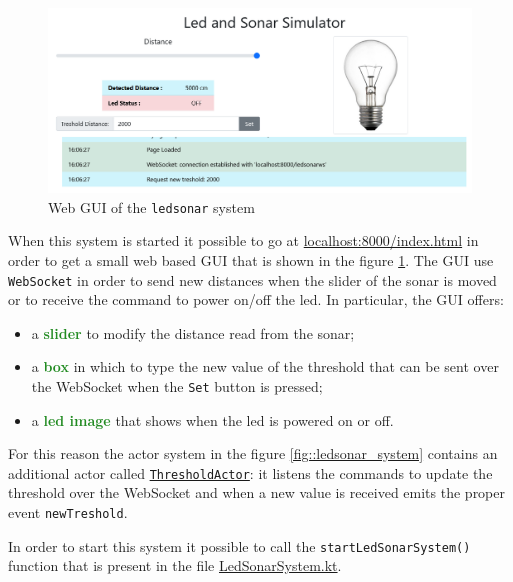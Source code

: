 \begin{figure}[h!]
	\centering
	\includegraphics[width=\textwidth]{img/[EG]led_sonar_actor_gui}
	\caption{Web GUI of the \texttt{ledsonar} system}
	\label{fig::ledsonar_system_gui}
\end{figure}

When this system is started it possible to go at \href{http://localhost:8000/index.html}{localhost:8000/index.html} in order to get a small web based GUI that is shown in the figure \ref{fig::ledsonar_system_gui}.
The GUI use \texttt{WebSocket} in order to send new distances when the slider of the sonar is moved or to receive the command to power on/off the led. In particular, the GUI offers:

\begin{itemize}
	\item a \textcolor{ForestGreen}{\textbf{slider}} to modify the distance read from the sonar;
	
	\item a \textcolor{ForestGreen}{\textbf{box}} in which to type the new value of the threshold that can be sent over the WebSocket when the \texttt{Set} button is pressed;
	
	\item a \textcolor{ForestGreen}{\textbf{led image}} that shows when the led is powered on or off.
\end{itemize}

For this reason the actor system in the figure \ref{fig::ledsonar_system} contains an additional actor called \underline{\texttt{ThresholdActor}}: it listens the commands to update the threshold over the WebSocket and when a new value is received emits the proper event \texttt{newTreshold}.

In order to start this system it possible to call the \texttt{startLedSonarSystem()} function that is present in the file \href{https://github.com/LM-96/QA-Extensions/blob/main/it.unibo.ledsonarsystem/src/main/kotlin/it/unibo/ledsonarsystem/LedSonarSystem.kt}{LedSonarSystem.kt}.

